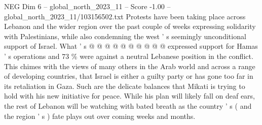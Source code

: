 \begin{textsample}{NEG Dim 6 – global\_north\_2023\_11 – Score -1.00 – global\_north\_2023\_11/103156502.txt}
Protests have been taking place across Lebanon and the wider region over the past couple of weeks expressing solidarity with Palestinians, while also condemning the west ' s seemingly unconditional support of Israel.
What ' s @ @ @ @ @ @ @ @ @ @ expressed support for Hamas ' s operations and 73 \% were against a neutral Lebanese position in the conflict.
This chimes with the views of many others in the Arab world and across a range of developing countries, that Israel is either a guilty party or has gone too far in its retaliation in Gaza.
Such are the delicate balances that Mikati is trying to hold with his new initiative for peace.
While his plan will likely fall on deaf ears, the rest of Lebanon will be watching with bated breath as the country ' s ( and the region ' s ) fate plays out over coming weeks and months.

\end{textsample}
